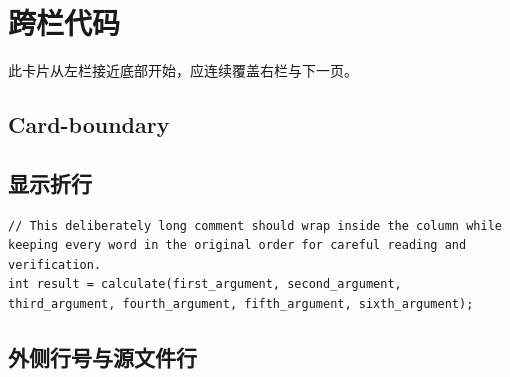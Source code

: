 \documentclass{article}
\begin{document}
\section{跨栏代码}
此卡片从左栏接近底部开始，应连续覆盖右栏与下一页。
\vspace*{.65\textheight}
\subsection{Card-boundary}
\subsection{显示折行}
\begin{verbatim}
// This deliberately long comment should wrap inside the column while keeping every word in the original order for careful reading and verification.
int result = calculate(first_argument, second_argument, third_argument, fourth_argument, fifth_argument, sixth_argument);
\end{verbatim}
\subsection{外侧行号与源文件行}
\end{document}
